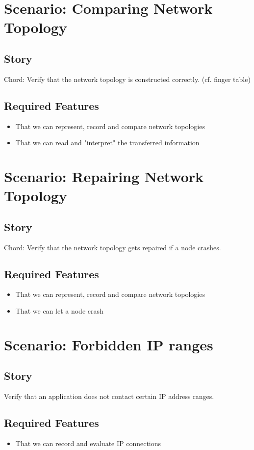 \documentclass[a4paper,oneside]{book}
\begin{document}
\section{Scenario: Comparing Network Topology}
\subsection{Story}
Chord: Verify that the network topology is constructed correctly. (cf. finger table)
\subsection{Required Features}
\begin{itemize}
\item That we can represent, record and compare network topologies
\item That we can read and "interpret" the transferred information
\end{itemize}


\section{Scenario: Repairing Network Topology}
\subsection{Story}
Chord: Verify that the network topology gets repaired if a node crashes.
\subsection{Required Features}
\begin{itemize}
\item That we can represent, record and compare network topologies
\item That we can let a node crash
\end{itemize}


\section{Scenario: Forbidden IP ranges}
\subsection{Story}
Verify that an application does not contact certain IP address ranges.
\subsection{Required Features}
\begin{itemize}
\item That we can record and evaluate IP connections
\end{itemize}
\end{document}
